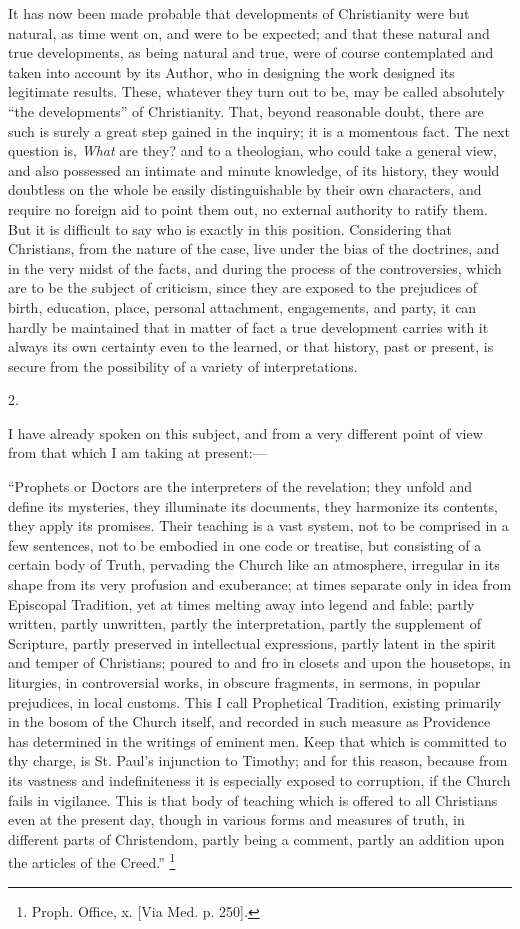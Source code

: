 It has now been made probable that developments of
Christianity were but natural, as time went on, and were
to be expected; and that these natural and true
developments, as being natural and true, were of course
contemplated and taken into account by its Author, who in
designing the work designed its legitimate results.
These, whatever they turn out to be, may be called
absolutely ``the developments'' of Christianity.
That, beyond reasonable doubt, there are such is surely a
great step gained in the inquiry; it is a momentous fact.
The next question is, \emph{What} are they? and to a
theologian, who could take a general view, and also
possessed an intimate and minute knowledge, of its
history, they would doubtless on the whole be easily
distinguishable by their own characters, and require no
foreign aid to point them out, no external authority to
ratify them. But it is difficult to say who is exactly in
this position. Considering that Christians, from the
nature of the case, live under the bias of the doctrines,
and in the very midst of the facts, and during the
process of the controversies, which are to be the subject
of criticism, since they are exposed to the prejudices of
birth, education, place, personal attachment,
engagements, and party, it can hardly be maintained that
in matter of fact a true development carries with it
always its own certainty even to the learned, or that
history, past or present, is secure from the possibility
of a variety of interpretations.

2.

I have already spoken on this subject, and from a very
different point of view from that which I am taking at
present:—

``Prophets or Doctors are the interpreters of the
revelation; they unfold and define its mysteries, they
illuminate its documents, they harmonize its contents,
they apply its promises. Their teaching is a vast system,
not to be comprised in a few sentences, not to be
embodied in one code or treatise, but consisting of a
certain body of Truth, pervading the Church like an
atmosphere, irregular in its shape from its very
profusion and exuberance; at times separate only in idea
from Episcopal Tradition, yet at times melting away into
legend and fable; partly written, partly unwritten,
partly the interpretation, partly the supplement of
Scripture, partly preserved in intellectual expressions,
partly latent in the spirit and temper of Christians;
poured to and fro in closets and upon the housetops, in
liturgies, in controversial works, in obscure fragments,
in sermons, in popular prejudices, in local customs. This
I call Prophetical Tradition, existing primarily in the
bosom of the Church itself, and recorded in such measure
as Providence has determined in the writings of eminent
men. Keep that which is committed to thy charge, is St.
Paul's injunction to Timothy; and for this reason,
because from its vastness and indefiniteness it is
especially exposed to corruption, if the Church fails in
vigilance. This is that body of teaching which is offered
to all Christians even at the present day, though in
various forms and measures of truth, in different parts
of Christendom, partly being a comment, partly an
addition upon the articles of the Creed.'' \footnote{Proph. Office, x. [Via Med. p. 250].}

